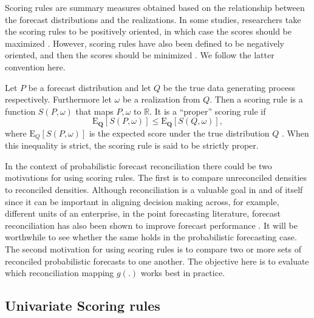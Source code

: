 \documentclass[a4paper, 11pt]{article}
\def\E{\text{E}}
\theoremstyle{theo}
\theoremstyle{definition}
\begin{document}
Scoring rules are summary measures obtained based on the relationship between the forecast distributions and the realizations. In some studies, researchers take the scoring rules to be positively oriented, in which case the scores should be maximized \citep{Gneiting2007}. However, scoring rules have also been defined to be negatively oriented, and then the scores should be minimized \citep{Gneiting2014}. We follow the latter convention here.

Let $P$ be a forecast distribution and let $Q$ be the true data generating process respectively. Furthermore let $\omega$ be a realization from $Q$. Then a scoring rule is a function $S(P,\omega)$ that maps $P,\omega$ to $\mathbb{R}$. It is a ``proper'' scoring rule if 
\begin{equation}\label{eq:(3.1.)}
\E_{\bm{Q}}[S(P,\omega)] \le \E_{\bm{Q}}[S(Q,\omega)],
\end{equation}
where $\E_{Q}[S(P,\omega)]$ is the expected score under the true distribution $Q$ \citep{Gneiting2008, Gneiting2014}.  When this inequality is strict, the scoring rule is said to be strictly proper.

In the context of probabilistic forecast reconciliation there could be two motivations for using scoring rules.  The first is to compare unreconciled densities to reconciled densities.  Although reconciliation is a valuable goal in and of itself since it can be important in aligning decision making across, for example, different units of an enterprise, in the point forecasting literature, forecast reconciliation has also been shown to improve forecast performance .  It will be worthwhile to see whether the same holds in the probabilistic forecasting case.  The second motivation for using scoring rules is to compare two or more sets of reconciled probabilistic forecasts to one another.  The objective here is to evaluate which reconciliation mapping $g(.)$ works best in practice.

\subsection{Univariate Scoring rules}
\end{document}

